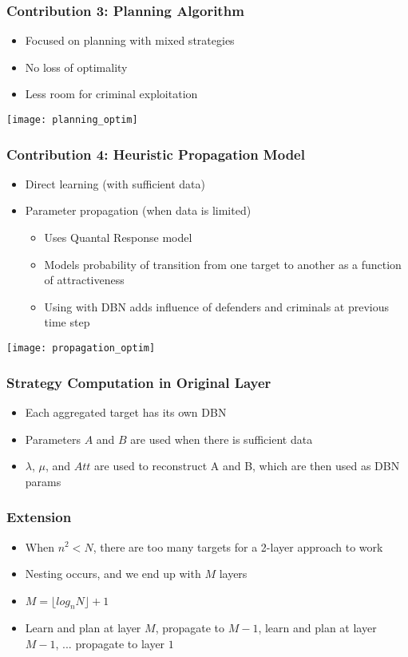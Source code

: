 \documentclass{beamer}
\begin{document}
	\begin{frame}
		\frametitle{Contribution 3: Planning Algorithm}
		\begin{itemize}
			\item Focused on planning with mixed strategies
			\item No loss of optimality
			\item Less room for criminal exploitation
		\end{itemize}
		\texttt{[image: planning\_optim]}
	\end{frame}

	\begin{frame}
		\frametitle{Contribution 4: Heuristic Propagation Model}
		\begin{itemize}
			\item Direct learning (with sufficient data)
			\item Parameter propagation (when data is limited)
				\begin{itemize}
					\item Uses Quantal Response model
					\item Models probability of transition from one target to another as a function of attractiveness
					\item Using with DBN adds influence of defenders and criminals at previous time step
				\end{itemize}
		\end{itemize}
		\texttt{[image: propagation\_optim]}
	\end{frame}

	\begin{frame}
		\frametitle{Strategy Computation in Original Layer}
		\begin{itemize}
			\item Each aggregated target has its own DBN
			\item Parameters $A$ and $B$ are used when there is sufficient data
			\item $\lambda$, $\mu$, and $Att$ are used to reconstruct A and B, which are then used as DBN params
		\end{itemize}
	\end{frame}

	\begin{frame}
		\frametitle{Extension}
		\begin{itemize}
			\item When $n^2 < N$, there are too many targets for a 2-layer approach to work
			\item Nesting occurs, and we end up with $M$ layers
			\item $ M = \lfloor log_{n}N \rfloor + 1 $
			\item Learn and plan at layer $M$, propagate to $M-1$, learn and plan at layer $M-1$, ... propagate to layer $1$
		\end{itemize}
	\end{frame}
\end{document}
